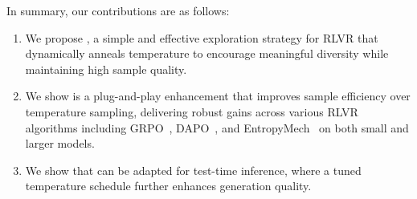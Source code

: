 In summary, our contributions are as follows:
\begin{enumerate}[wide, labelwidth=!, labelindent=0pt]
    \item[\circone] We propose \alg, a simple and effective exploration strategy for RLVR that dynamically anneals temperature to encourage meaningful diversity while maintaining high sample quality.
    \item[\circtwo] We show \alg is a plug-and-play enhancement that improves sample efficiency over temperature sampling, delivering robust gains across various RLVR algorithms including GRPO~\citep{shao2024deepseekmath}, DAPO~\citep{yu2025dapo}, and EntropyMech~\citep{cui2025entropy} on both small and larger models.
    \item[\circthree] We show that \alg can be adapted for test-time inference, where a tuned temperature schedule further enhances generation quality.
\end{enumerate}



